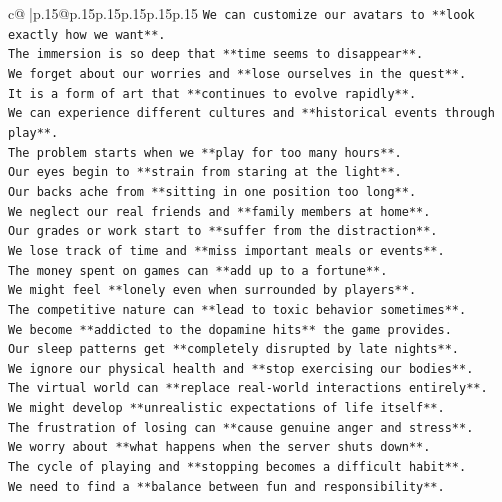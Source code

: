 \documentclass{article}
\begin{document}
{\begin{supertabular}{c@{$\;$}|p{.15\linewidth}@{}p{.15\linewidth}p{.15\linewidth}p{.15\linewidth}p{.15\linewidth}p{.15\linewidth}}
{{{\texttt{We can customize our avatars to **look exactly how we want**.} \\
\texttt{The immersion is so deep that **time seems to disappear**.} \\
\texttt{We forget about our worries and **lose ourselves in the quest**.} \\
\texttt{It is a form of art that **continues to evolve rapidly**.} \\
\texttt{We can experience different cultures and **historical events through play**.} \\
\texttt{The problem starts when we **play for too many hours**.} \\
\texttt{Our eyes begin to **strain from staring at the light**.} \\
\texttt{Our backs ache from **sitting in one position too long**.} \\
\texttt{We neglect our real friends and **family members at home**.} \\
\texttt{Our grades or work start to **suffer from the distraction**.} \\
\texttt{We lose track of time and **miss important meals or events**.} \\
\texttt{The money spent on games can **add up to a fortune**.} \\
\texttt{We might feel **lonely even when surrounded by players**.} \\
\texttt{The competitive nature can **lead to toxic behavior sometimes**.} \\
\texttt{We become **addicted to the dopamine hits** the game provides.} \\
\texttt{Our sleep patterns get **completely disrupted by late nights**.} \\
\texttt{We ignore our physical health and **stop exercising our bodies**.} \\
\texttt{The virtual world can **replace real{-}world interactions entirely**.} \\
\texttt{We might develop **unrealistic expectations of life itself**.} \\
\texttt{The frustration of losing can **cause genuine anger and stress**.} \\
\texttt{We worry about **what happens when the server shuts down**.} \\
\texttt{The cycle of playing and **stopping becomes a difficult habit**.} \\
\texttt{We need to find a **balance between fun and responsibility**.} \\
}}}
\end{supertabular}}
\end{document}
